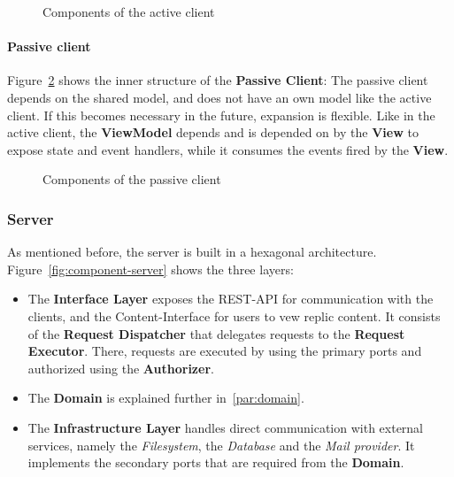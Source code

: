 \begin{figure}
    \centering
    \caption{Components of the active client}
    \label{fig:component-clients-active}
\end{figure}

\paragraph{Passive client}
Figure~\ref{fig:component-clients-passive} shows the inner structure of the \textbf{Passive Client}: The passive client depends on the shared model, and does not have an own model like the active client.
If this becomes necessary in the future, expansion is flexible.
Like in the active client, the \textbf{ViewModel} depends and is depended on by the \textbf{View} to expose state and event handlers, while it consumes the events fired by the \textbf{View}.

\begin{figure}
    \centering
    \caption{Components of the passive client}
    \label{fig:component-clients-passive}
\end{figure}

\subsubsection{Server}
As mentioned before, the server is built in a hexagonal architecture.
Figure~\ref{fig:component-server} shows the three layers:
\begin{itemize}
    \item The \textbf{Interface Layer} exposes the REST-API for communication with the clients, and the Content-Interface for users to vew replic content.
    It consists of the \textbf{Request Dispatcher} that delegates requests to the \textbf{Request Executor}.
    There, requests are executed by using the primary ports and authorized using the \textbf{Authorizer}.
    \item The \textbf{Domain} is explained further in~\ref{par:domain}.
    \item The \textbf{Infrastructure Layer} handles direct communication with external services, namely the \textit{Filesystem}, the \textit{Database} and the \textit{Mail provider}.
    It implements the secondary ports that are required from the \textbf{Domain}.
\end{itemize}

